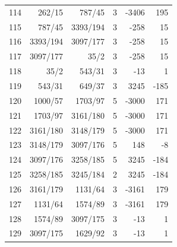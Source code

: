 \documentclass[11pt,a4paper]{article}
\begin{document}
\begin{minipage}[t]{.49\linewidth}
\begin{tabular*}{\linewidth}{@{}r@{\extracolsep{\fill}}rrrrr@{}}
114 & 262/15 & 787/45 & 3 & -3406 & 195\\
115 & 787/45 & 3393/194 & 3 & -258 & 15\\
116 & 3393/194 & 3097/177 & 3 & -258 & 15\\
117 & 3097/177 & 35/2 & 3 & -258 & 15\\
118 & 35/2 & 543/31 & 3 & -13 & 1\\
119 & 543/31 & 649/37 & 3 & 3245 & -185\\
120 & 1000/57 & 1703/97 & 5 & -3000 & 171\\
121 & 1703/97 & 3161/180 & 5 & -3000 & 171\\
122 & 3161/180 & 3148/179 & 5 & -3000 & 171\\
123 & 3148/179 & 3097/176 & 5 & 148 & -8\\
124 & 3097/176 & 3258/185 & 5 & 3245 & -184\\
125 & 3258/185 & 3245/184 & 2 & 3245 & -184\\
126 & 3161/179 & 1131/64 & 3 & -3161 & 179\\
127 & 1131/64 & 1574/89 & 3 & -3161 & 179\\
128 & 1574/89 & 3097/175 & 3 & -13 & 1\\
129 & 3097/175 & 1629/92 & 3 & -13 & 1\\
\bottomrule\end{tabular*}\end{minipage}\hfill
\end{document}
